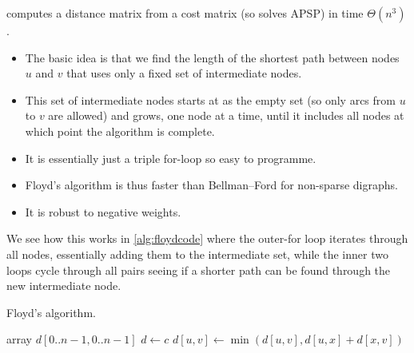  computes a distance matrix from a cost matrix (so solves APSP) in time $\Theta(n^3)$. 
\begin{itemize}
  \item The basic idea is that we find the length of the shortest path between nodes $u$ and $v$ that uses only a fixed set of intermediate nodes. 
  \item This set of intermediate nodes starts at as the empty set (so only arcs from $u$ to $v$ are allowed) and grows, one node at a time, 
until it includes all nodes at which point the algorithm is complete.
  \item It is essentially just a triple for-loop so easy to programme.
  \item Floyd's algorithm is thus faster than Bellman--Ford for non-sparse digraphs.
  \item It is robust to negative weights. 
\end{itemize}

We see how this works in \cref{alg:floydcode} where the outer-for loop iterates through all nodes, essentially adding them to the intermediate set, 
while the inner two loops cycle through all pairs seeing if a shorter path can be found through the new intermediate node.

\begin{algorithm}[H]
  \caption{Floyd's algorithm.}
  \label{alg:floydcode}
\begin{algorithmic}[1]
	\State array $d[0..n-1,0..n-1]$ 
	\State $d \gets c$ 
	 
				\State $d[u,v] \gets \min( d[u,v], d[u,x] + d[x,v] )$
				 
			\EndFor
		\EndFor
	\EndFor
	\State {}
\EndFunction
\end{algorithmic}
\end{algorithm}


